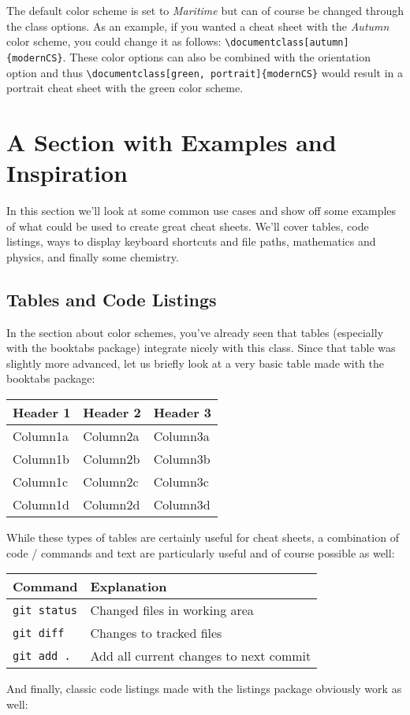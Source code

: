 \documentclass{modernCS}
\begin{document}
The default color scheme is set to \textit{Maritime} but can of course be changed through the class options. As an example, if you wanted a cheat sheet with the \textit{Autumn} color scheme, you could change it as follows: \verb|\documentclass[autumn]{modernCS}|. These color options can also be combined with the orientation option and thus \verb|\documentclass[green, portrait]{modernCS}| would result in a portrait cheat sheet with the green color scheme.

\section{A Section with Examples and Inspiration}
In this section we'll look at some common use cases and show off some examples of what could be used to create great cheat sheets. We'll cover tables, code listings, ways to display keyboard shortcuts and file paths, mathematics and physics, and finally some chemistry.

\subsection{Tables and Code Listings}
In the section about color schemes, you've already seen that tables (especially with the booktabs package) integrate nicely with this class. Since that table was slightly more advanced, let us briefly look at a very basic table made with the booktabs package:
\begin{center}
\begin{tabular}{lll}
\toprule
Header 1 & Header 2 & Header 3 \\
\midrule
Column1a & Column2a & Column3a \\
Column1b & Column2b & Column3b \\
Column1c & Column2c & Column3c \\
Column1d & Column2d & Column3d \\
\bottomrule
\end{tabular}
\end{center}
While these types of tables are certainly useful for cheat sheets, a combination of code / commands and text are particularly useful and of course possible as well:
\begin{center}
\begin{tabular}{ll}
\toprule
Command & Explanation \\
\midrule
\verb|git status| & Changed files in working area \\
\verb|git diff| & Changes to tracked files \\
\verb|git add .| & Add all current changes to next commit \\
\bottomrule
\end{tabular}
\end{center}
And finally, classic code listings made with the listings package obviously work as well:
\end{document}

